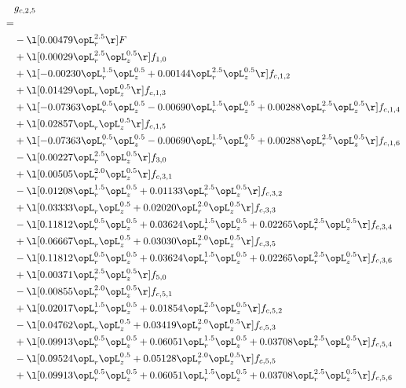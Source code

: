 \begin{alignat}{2} 
\label{eq:g_25_0} 
& g_{c,2,5} \nonumber \\ 
 = \\ 
& - \l[  0.00479 \opL_r^{2.5}  \r] F \nonumber \\ 
& + \l[  0.00029 \opL_r^{2.5} \opL_z^{0.5}  \r] f_{1,0} \nonumber \\ 
& + \l[  -0.00230 \opL_r^{1.5} \opL_z^{0.5} +  0.00144 \opL_r^{2.5} \opL_z^{0.5}  \r] f_{c,1,2} \nonumber \\ 
& + \l[  0.01429 \opL_r \opL_z^{0.5}  \r] f_{c,1,3} \nonumber \\ 
& + \l[  -0.07363 \opL_r^{0.5} \opL_z^{0.5}   -0.00690 \opL_r^{1.5} \opL_z^{0.5} +  0.00288 \opL_r^{2.5} \opL_z^{0.5}  \r] f_{c,1,4} \nonumber \\ 
& + \l[  0.02857 \opL_r \opL_z^{0.5}  \r] f_{c,1,5} \nonumber \\ 
& + \l[  -0.07363 \opL_r^{0.5} \opL_z^{0.5}   -0.00690 \opL_r^{1.5} \opL_z^{0.5} +  0.00288 \opL_r^{2.5} \opL_z^{0.5}  \r] f_{c,1,6} \nonumber \\ 
& - \l[  0.00227 \opL_r^{2.5} \opL_z^{0.5}  \r] f_{3,0} \nonumber \\ 
& + \l[  0.00505 \opL_r^{2.0} \opL_z^{0.5}  \r] f_{c,3,1} \nonumber \\ 
& - \l[  0.01208 \opL_r^{1.5} \opL_z^{0.5} +  0.01133 \opL_r^{2.5} \opL_z^{0.5}  \r] f_{c,3,2} \nonumber \\ 
& + \l[  0.03333 \opL_r \opL_z^{0.5} +  0.02020 \opL_r^{2.0} \opL_z^{0.5}  \r] f_{c,3,3} \nonumber \\ 
& - \l[  0.11812 \opL_r^{0.5} \opL_z^{0.5} +  0.03624 \opL_r^{1.5} \opL_z^{0.5} +  0.02265 \opL_r^{2.5} \opL_z^{0.5}  \r] f_{c,3,4} \nonumber \\ 
& + \l[  0.06667 \opL_r \opL_z^{0.5} +  0.03030 \opL_r^{2.0} \opL_z^{0.5}  \r] f_{c,3,5} \nonumber \\ 
& - \l[  0.11812 \opL_r^{0.5} \opL_z^{0.5} +  0.03624 \opL_r^{1.5} \opL_z^{0.5} +  0.02265 \opL_r^{2.5} \opL_z^{0.5}  \r] f_{c,3,6} \nonumber \\ 
& + \l[  0.00371 \opL_r^{2.5} \opL_z^{0.5}  \r] f_{5,0} \nonumber \\ 
& - \l[  0.00855 \opL_r^{2.0} \opL_z^{0.5}  \r] f_{c,5,1} \nonumber \\ 
& + \l[  0.02017 \opL_r^{1.5} \opL_z^{0.5} +  0.01854 \opL_r^{2.5} \opL_z^{0.5}  \r] f_{c,5,2} \nonumber \\ 
& - \l[  0.04762 \opL_r \opL_z^{0.5} +  0.03419 \opL_r^{2.0} \opL_z^{0.5}  \r] f_{c,5,3} \nonumber \\ 
& + \l[  0.09913 \opL_r^{0.5} \opL_z^{0.5} +  0.06051 \opL_r^{1.5} \opL_z^{0.5} +  0.03708 \opL_r^{2.5} \opL_z^{0.5}  \r] f_{c,5,4} \nonumber \\ 
& - \l[  0.09524 \opL_r \opL_z^{0.5} +  0.05128 \opL_r^{2.0} \opL_z^{0.5}  \r] f_{c,5,5} \nonumber \\ 
& + \l[  0.09913 \opL_r^{0.5} \opL_z^{0.5} +  0.06051 \opL_r^{1.5} \opL_z^{0.5} +  0.03708 \opL_r^{2.5} \opL_z^{0.5}  \r] f_{c,5,6} \nonumber \\ 
\end{alignat} 


